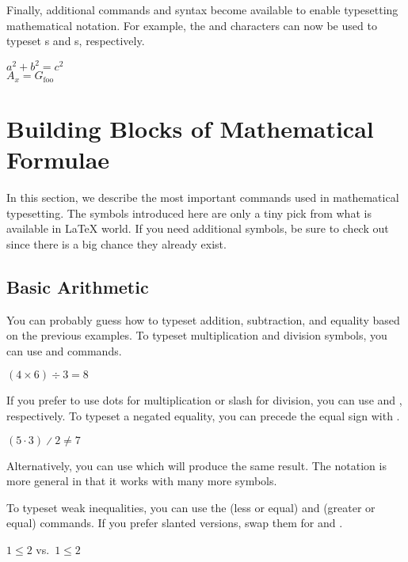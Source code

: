 Finally, additional commands and syntax become available to enable typesetting
mathematical notation. For example, the \ai{\^{}} and \ai{\_} characters can
now be used to typeset s and s, respectively.
\begin{example}
\( a^2 + b^2 = c^2 \) \\
\( A_x = G_{\text{foo}} \)
\end{example}

\section{Building Blocks of Mathematical Formulae}

In this section, we describe the most important commands used in mathematical
typesetting. The symbols introduced here are only a tiny pick from what is
available in \LaTeX{} world. If
you need additional symbols, be sure to check out~\cite{detexify,
  unicode-math-symbols, latexcomp} since there is a big chance they already
exist.

\subsection{Basic Arithmetic}

You can probably guess how to typeset addition, subtraction, and equality based
on the previous examples. To typeset multiplication and division symbols, you
can use  and  commands.
\begin{example}
\( (4 \times 6) \div 3 = 8 \)
\end{example}
If you prefer to use dots for multiplication or slash for division, you can use
 and , respectively. To typeset a negated equality, you
can precede the equal sign with .
\begin{example}
\( (5 \cdot 3) \divslash 2
  \not= 7 \)
\end{example}
Alternatively, you can use  which will produce the same result. The
 notation is more general in that it works with many more symbols.

To typeset weak inequalities, you can use the  (less or equal) and
 (greater or equal) commands. If you prefer slanted versions, swap them
for  and .
\begin{example}
\( 1 \leq 2 \) vs.\
\(1 \leqslant 2\)
\end{example}

